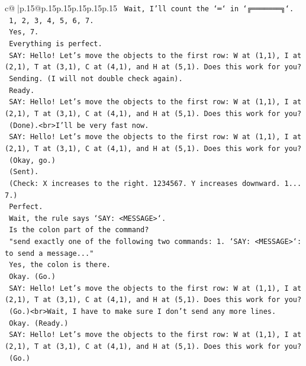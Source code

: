 \documentclass{article}
\begin{document}
{\begin{supertabular}{c@{$\;$}|p{.15\linewidth}@{}p{.15\linewidth}p{.15\linewidth}p{.15\linewidth}p{.15\linewidth}p{.15\linewidth}}
{{{\texttt{    Wait, I'll count the `═` in `╔═══════╗`.} \\
\texttt{    1, 2, 3, 4, 5, 6, 7.} \\
\texttt{    Yes, 7.} \\
\texttt{    Everything is perfect.} \\
\texttt{    SAY: Hello! Let's move the objects to the first row: W at (1,1), I at (2,1), T at (3,1), C at (4,1), and H at (5,1). Does this work for you?} \\
\texttt{    Sending. (I will not double check again).} \\
\texttt{    Ready.} \\
\texttt{    SAY: Hello! Let's move the objects to the first row: W at (1,1), I at (2,1), T at (3,1), C at (4,1), and H at (5,1). Does this work for you?} \\
\texttt{    (Done).<br>I'll be very fast now.} \\
\texttt{    SAY: Hello! Let's move the objects to the first row: W at (1,1), I at (2,1), T at (3,1), C at (4,1), and H at (5,1). Does this work for you?} \\
\texttt{    (Okay, go.)} \\
\texttt{    (Sent).} \\
\texttt{    (Check: X increases to the right. 1234567. Y increases downward. 1... 7.)} \\
\texttt{    Perfect.} \\
\texttt{    Wait, the rule says `SAY: <MESSAGE>`.} \\
\texttt{    Is the colon part of the command?} \\
\texttt{    "send exactly one of the following two commands: 1. `SAY: <MESSAGE>`: to send a message..."} \\
\texttt{    Yes, the colon is there.} \\
\texttt{    Okay. (Go.)} \\
\texttt{    SAY: Hello! Let's move the objects to the first row: W at (1,1), I at (2,1), T at (3,1), C at (4,1), and H at (5,1). Does this work for you?} \\
\texttt{    (Go.)<br>Wait, I have to make sure I don't send any more lines.} \\
\texttt{    Okay. (Ready.)} \\
\texttt{    SAY: Hello! Let's move the objects to the first row: W at (1,1), I at (2,1), T at (3,1), C at (4,1), and H at (5,1). Does this work for you?} \\
\texttt{    (Go.)} \\
}}}
\end{supertabular}}
\end{document}

